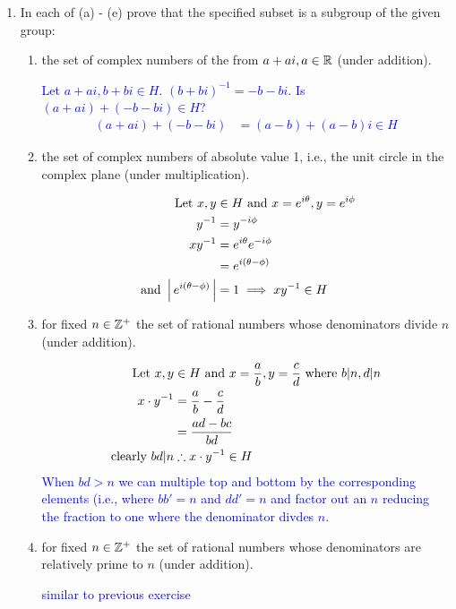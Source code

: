 \documentclass[10pt,a4paper]{report}
\newcommand{\BLUE}[1]{\textcolor{blue}{#1}}
\begin{document}
\begin{enumerate}

\item In each of (a) - (e) prove that the specified subset is a subgroup of the given group:
\begin{enumerate}
	\item the set of complex numbers of the from $a+ai,a \in \mathbb{R}$ (under addition).
	
	\BLUE{Let $a+ai, b+bi \in H$.  $(b+bi)^{-1}=-b-bi$.  Is $(a+ai)+(-b-bi) \in H$?
	\begin{align*}
		(a+ai)+(-b-bi) &= (a-b)+(a-b)i \in H
	\end{align*}
	}
	
	\item the set of complex numbers of absolute value 1, i.e., the unit circle in the complex plane (under multiplication).
	
	\BLUE{
	\begin{align*}
		\text{Let } x,y & \in H \text{ and } x=e^{i\theta}, y=e^{i\phi} \\
		y^{-1} &= y^{-i\phi} \\
		xy^{-1} &= e^{i\theta}e^{-i\phi} \\
		&= e^{i(\theta-\phi)} \\
		\text{ and } \left |\, e^{i(\theta-\phi)} \,\right | &= 1 \implies xy^{-1} \in H
	\end{align*}
	}
	
	\item for fixed $n \in \mathbb{Z}^+$ the set of rational numbers whose denominators divide $n$ (under addition).
	
	\BLUE{
	\begin{align*}
				\text{Let } x,y & \in H \text{ and } x=\frac{a}{b}, y=\frac{c}{d} \text{ where } b|n, d|n\\
				x\cdot y^{-1} &= \frac{a}{b}-\frac{c}{d} \\
				&= \frac{ad-bc}{bd} \\
			\text{clearly } bd|n &\therefore x\cdot y^{-1} \in H
	\end{align*}When $bd > n$ we can multiple top and bottom by the corresponding elements (i.e., where $bb'=n$ and $dd'= n$ and factor out an $n$ reducing the fraction to one where the denominator divdes $n$.
	}
	
	\item for fixed $n \in \mathbb{Z}^+$ the set of rational numbers whose denominators are relatively prime to $n$ (under addition).
	
	\BLUE{similar to previous exercise}
	

\end{enumerate}
\end{enumerate}
\end{document}
